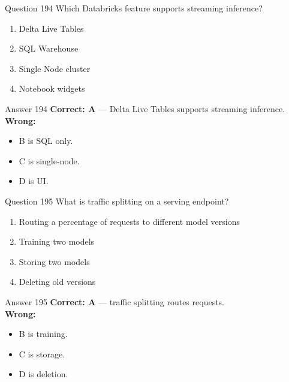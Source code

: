 \documentclass[aspectratio=169,11pt]{beamer}
\begin{document}
	\begin{frame}{Question 194}
		Which Databricks feature supports streaming inference?
		\begin{enumerate}[label=\Alph*.]
			\item Delta Live Tables
			\item SQL Warehouse
			\item Single Node cluster
			\item Notebook widgets
		\end{enumerate}
	\end{frame}
	\begin{frame}{Answer 194}
		\textbf{Correct: A} --- Delta Live Tables supports streaming inference.\\
		\vspace{0.5em}
		\textbf{Wrong:}
		\begin{itemize}
			\item B is SQL only.
			\item C is single-node.
			\item D is UI.
		\end{itemize}
	\end{frame}
	
	\begin{frame}{Question 195}
		What is traffic splitting on a serving endpoint?
		\begin{enumerate}[label=\Alph*.]
			\item Routing a percentage of requests to different model versions
			\item Training two models
			\item Storing two models
			\item Deleting old versions
		\end{enumerate}
	\end{frame}
	\begin{frame}{Answer 195}
		\textbf{Correct: A} --- traffic splitting routes requests.\\
		\vspace{0.5em}
		\textbf{Wrong:}
		\begin{itemize}
			\item B is training.
			\item C is storage.
			\item D is deletion.
		\end{itemize}
	\end{frame}
	
\end{document}
